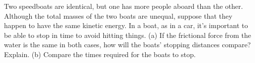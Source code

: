 Two speedboats are identical, but one has more people aboard than the
other. Although the total masses of the two boats are unequal, suppose
that they happen to have the same kinetic energy. In a boat, as in a car,
it's important to be able to stop in time to avoid hitting things.
(a) If the frictional force from the water is the same in both cases,
how will the boats' stopping distances
compare? Explain. (b) Compare the times required for the boats to stop.
